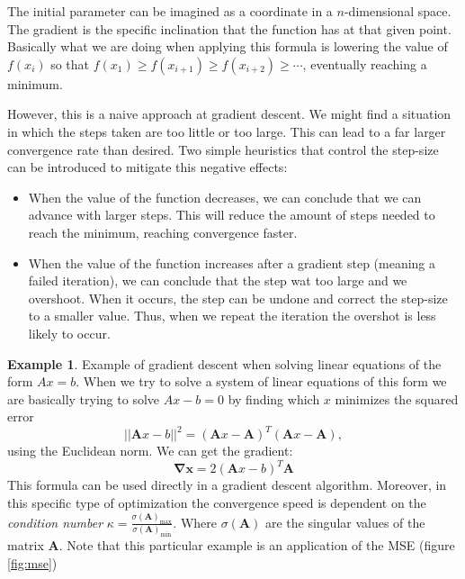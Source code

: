 \documentclass[]{article}
\theoremstyle{definition}
\newtheorem{exmp}{Example}[section]
\begin{document}
The initial parameter can be imagined as a coordinate in a $n$-dimensional space. The gradient is the specific inclination that the function has at that given point. Basically what we are doing when applying this formula is lowering the value of $f(x_i)$ so that $f(x_1) \geq f(x_{i+1}) \geq f(x_{i+2}) \geq \cdots$, eventually reaching a minimum.

However, this is a naive approach at gradient descent. We might find a situation in which the steps taken are too little or too large. This can lead to a far larger convergence rate than desired. Two simple heuristics that control the step-size can be introduced to mitigate this negative effects:
\begin{itemize}
	\item When the value of the function decreases, we can conclude that we can advance with larger steps. This will reduce the amount of steps needed to reach the minimum, reaching convergence faster. 
	\item When the value of the function increases after a gradient step (meaning a failed iteration), we can conclude that the step wat too large and we overshoot. When it occurs, the step can be undone and correct the step-size to a smaller value. Thus, when we repeat the iteration the overshot is less likely to occur. 
\end{itemize}

\begin{exmp}
Example of gradient descent when solving linear equations of the form $Ax = b$. When we try to solve a system of linear equations of this form we are basically trying to solve $Ax-b = 0$ by finding which $x$ minimizes the squared error
\begin{equation*}
	||{\mathbf{A}x-b}||^2 = (\mathbf{A}x-\mathbf{A})^T(\mathbf{A}x-\mathbf{A}),
\end{equation*}
using the Euclidean norm. We can get the gradient:
\begin{equation*}
	\boldsymbol{\nabla} \boldsymbol{x} = 2(\mathbf{A}x-b)^T\mathbf{A}
\end{equation*}
This formula can be used directly in a gradient descent algorithm. Moreover, in this specific type of optimization the convergence speed is dependent on the \textit{condition number} $\kappa = \frac{\sigma(\mathbf{A})_{\max}}{\sigma(\mathbf{A})_{\min}}$. Where $\sigma(\mathbf{A})$ are the singular values of the matrix $\mathbf{A}$. Note that this particular example is an application of the MSE (figure \ref{fig:mse})

\end{exmp}
\end{document}
